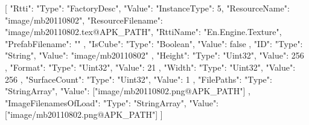 [{
        "Rtti": {
            "Type": "FactoryDesc",
            "Value": {
                "InstanceType": 5,
                "ResourceName": "image/mb20110802",
                "ResourceFilename": "image/mb20110802.tex@APK_PATH",
                "RttiName": "En.Engine.Texture",
                "PrefabFilename": ""
            }
        },
        "IsCube": {
            "Type": "Boolean",
            "Value": false
        },
        "ID": {
            "Type": "String",
            "Value": "image/mb20110802"
        },
        "Height": {
            "Type": "Uint32",
            "Value": 256
        },
        "Format": {
            "Type": "Uint32",
            "Value": 21
        },
        "Width": {
            "Type": "Uint32",
            "Value": 256
        },
        "SurfaceCount": {
            "Type": "Uint32",
            "Value": 1
        },
        "FilePaths": {
            "Type": "StringArray",
            "Value": ["image/mb20110802.png@APK_PATH"]
        },
        "ImageFilenamesOfLoad": {
            "Type": "StringArray",
            "Value": ["image/mb20110802.png@APK_PATH"]
        }
    }]